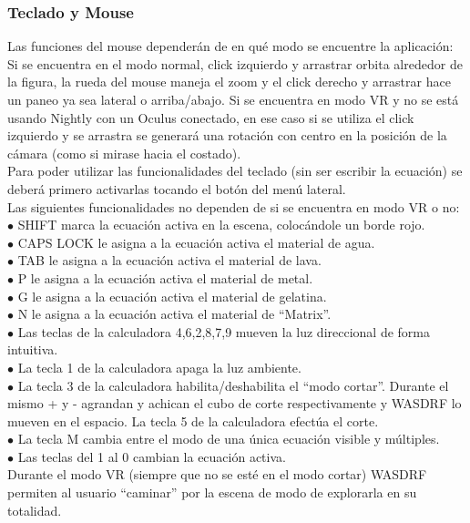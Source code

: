 \documentclass[12pt]{article}
\begin{document}
\subsubsection{Teclado y Mouse}
Las funciones del mouse dependerán de en qué modo se encuentre la aplicación:
Si se encuentra en el modo normal, click izquierdo y arrastrar orbita alrededor de la figura,  la rueda del mouse maneja el zoom y el click derecho y arrastrar hace un paneo ya sea lateral o arriba/abajo.
Si se encuentra en modo VR y no se está usando Nightly con un Oculus conectado, en ese caso si se utiliza el click izquierdo y se arrastra se generará una rotación con centro en la posición de la cámara (como si mirase hacia el costado).
\\Para poder utilizar las funcionalidades del teclado (sin ser escribir la ecuación) se deberá primero activarlas tocando el botón del menú lateral.
\\Las siguientes funcionalidades no dependen de si se encuentra en modo VR o no:
\\$\bullet$ SHIFT marca la ecuación activa en la escena, colocándole un borde rojo.
\\$\bullet$ CAPS LOCK le asigna a la ecuación activa el material de agua.
\\$\bullet$ TAB le asigna a la ecuación activa el material de lava.
\\$\bullet$ P le asigna a la ecuación activa el material de metal.
\\$\bullet$ G le asigna a la ecuación activa el material de gelatina.
\\$\bullet$ N le asigna a la ecuación activa el material de “Matrix”.
\\$\bullet$ Las teclas de la calculadora 4,6,2,8,7,9 mueven la luz direccional de forma intuitiva.
\\$\bullet$ La tecla 1 de la calculadora apaga la luz ambiente.
\\$\bullet$ La tecla 3 de la calculadora habilita/deshabilita el “modo cortar”. Durante el mismo + y - agrandan y achican el cubo de corte respectivamente y WASDRF lo mueven en el espacio. La tecla 5 de la calculadora efectúa el corte.
\\$\bullet$ La tecla M cambia entre el modo de una única ecuación visible y múltiples.
\\$\bullet$ Las teclas del 1 al 0 cambian la ecuación activa. 
\\Durante el modo VR  (siempre que no se esté en el modo cortar) WASDRF  permiten al usuario “caminar” por la escena de modo de explorarla en su totalidad.
\end{document}

